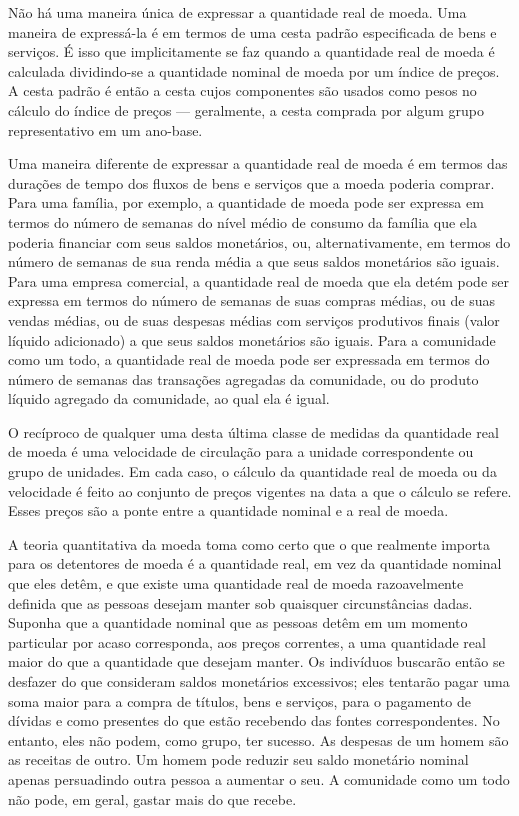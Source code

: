 \documentclass[12pt]{article}
\begin{document}
Não há uma maneira única de expressar a quantidade real de moeda. Uma maneira de expressá-la é em termos de uma cesta padrão especificada de bens e serviços. É isso que implicitamente se faz quando a quantidade real de moeda é calculada dividindo-se a quantidade nominal de moeda por um índice de preços. A cesta padrão é então a cesta cujos componentes são usados como pesos no cálculo do índice de preços — geralmente, a cesta comprada por algum grupo representativo em um ano-base.

Uma maneira diferente de expressar a quantidade real de moeda é em termos das durações de tempo dos fluxos de bens e serviços que a moeda poderia comprar. Para uma família, por exemplo, a quantidade de moeda pode ser expressa em termos do número de semanas do nível médio de consumo da família que ela poderia financiar com seus saldos monetários, ou, alternativamente, em termos do número de semanas de sua renda média a que seus saldos monetários são iguais. Para uma empresa comercial, a quantidade real de moeda que ela detém pode ser expressa em termos do número de semanas de suas compras médias, ou de suas vendas médias, ou de suas despesas médias com serviços produtivos finais (valor líquido adicionado) a que seus saldos monetários são iguais. Para a comunidade como um todo, a quantidade real de moeda pode ser expressada em termos do número de semanas das transações agregadas da comunidade, ou do produto líquido agregado da comunidade, ao qual ela é igual.

O recíproco de qualquer uma desta última classe de medidas da quantidade real de moeda é uma velocidade de circulação para a unidade correspondente ou grupo de unidades. Em cada caso, o cálculo da quantidade real de moeda ou da velocidade é feito ao conjunto de preços vigentes na data a que o cálculo se refere. Esses preços são a ponte entre a quantidade nominal e a real de moeda.

A teoria quantitativa da moeda toma como certo que o que realmente importa para os detentores de moeda é a quantidade real, em vez da quantidade nominal que eles detêm, e que existe uma quantidade real de moeda razoavelmente definida que as pessoas desejam manter sob quaisquer circunstâncias dadas. Suponha que a quantidade nominal que as pessoas detêm em um momento particular por acaso corresponda, aos preços correntes, a uma quantidade real maior do que a quantidade que desejam manter. Os indivíduos buscarão então se desfazer do que consideram saldos monetários excessivos; eles tentarão pagar uma soma maior para a compra de títulos, bens e serviços, para o pagamento de dívidas e como presentes do que estão recebendo das fontes correspondentes. No entanto, eles não podem, como grupo, ter sucesso. As despesas de um homem são as receitas de outro. Um homem pode reduzir seu saldo monetário nominal apenas persuadindo outra pessoa a aumentar o seu. A comunidade como um todo não pode, em geral, gastar mais do que recebe.
\end{document}
